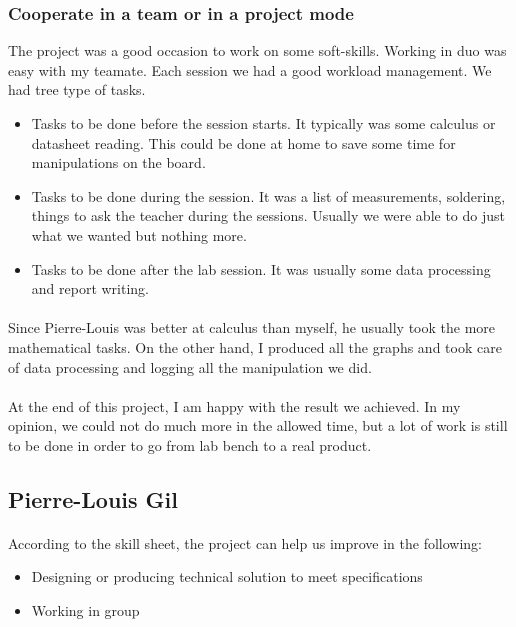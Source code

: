 \documentclass{article}[12pt]
\begin{document}
\begin{appendices}
\subsubsection{Cooperate in a team or in a project mode}
The project was a good occasion to work on some soft-skills. Working in duo was easy with my teamate. Each session we had a good workload management. We had tree type of tasks.
\begin{itemize}
    \item Tasks to be done before the session starts. It typically was some calculus or datasheet reading. This could be done at home to save some time for manipulations on the board.
    \item Tasks to be done during the session. It was a list of measurements, soldering, things to ask the teacher during the sessions. Usually we were able to do just what we wanted but nothing more.
    \item Tasks to be done after the lab session. It was usually some data processing and report writing.
\end{itemize}
\paragraph{}
Since Pierre-Louis was better at calculus than myself, he usually took the more mathematical tasks. On the other hand, I produced all the graphs and took care of data processing and logging all the manipulation we did.
\paragraph{}
At the end of this project, I am happy with the result we achieved. In my opinion, we could not do much more in the allowed time, but a lot of work is still to be done in order to go from lab bench to a real product.
\newpage
\subsection{Pierre-Louis Gil}
\paragraph{}
According to the skill sheet, the project can help us improve in the following:
\begin{itemize}
    \item  Designing or producing technical solution to meet specifications
    \item Working in group
\end{itemize}

\end{appendices}
\end{document}
